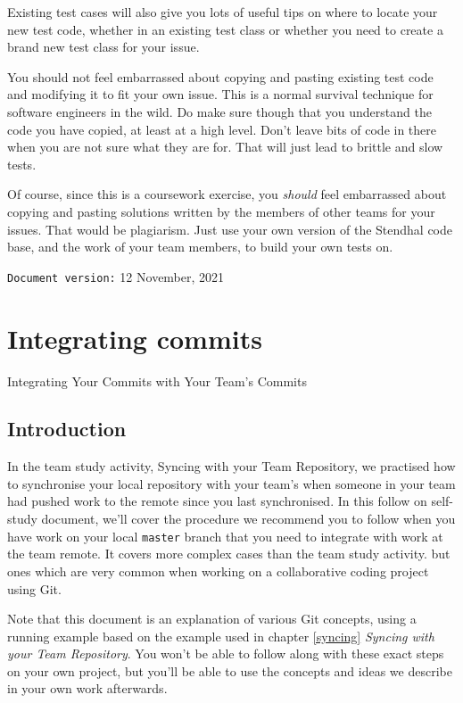 \documentclass[
]{book}
\begin{document}
Existing test cases will also give you lots of useful tips on where to locate your new test code, whether in an existing test class or whether you need to create a brand new test class for your issue.

You should not feel embarrassed about copying and pasting existing test code and modifying it to fit your own issue. This is a normal survival technique for software engineers in the wild. Do make sure though that you understand the code you have copied, at least at a high level. Don't leave bits of code in there when you are not sure what they are for. That will just lead to brittle and slow tests.

Of course, since this is a coursework exercise, you \emph{should} feel embarrassed about copying and pasting solutions written by the members of other teams for your issues. That would be plagiarism. Just use your own version of the Stendhal code base, and the work of your team members, to build your own tests on.

\texttt{Document\ version:} 12 November, 2021

\hypertarget{committing}{%
\chapter{Integrating commits}\label{committing}}

Integrating Your Commits with Your Team's Commits

\hypertarget{commintro}{%
\section{Introduction}\label{commintro}}

In the team study activity, Syncing with your Team Repository, we practised how to synchronise your local repository with your team's when someone in your team had pushed work to the remote since you last synchronised. In this follow on self-study document, we'll cover the procedure we recommend you to follow when you have work on your local \texttt{master} branch that you need to integrate with work at the team remote. It covers more complex cases than the team study activity. but ones which are very common when working on a collaborative coding project using Git.

Note that this document is an explanation of various Git concepts, using a running example based on the example used in chapter \ref{syncing} \emph{Syncing with your Team Repository}. You won't be able to follow along with these exact steps on your own project, but you'll be able to use the concepts and ideas we describe in your own work afterwards.
\end{document}

